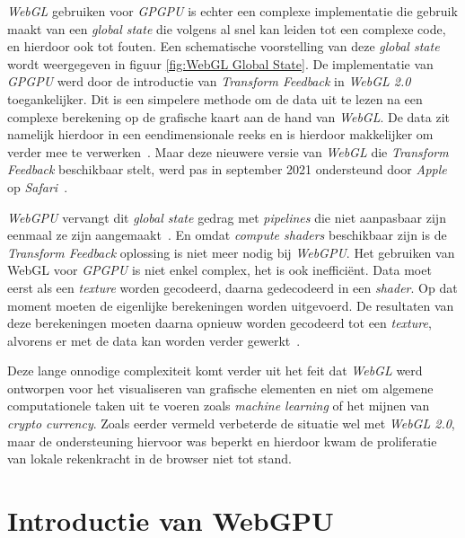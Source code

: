 \textit{WebGL} gebruiken voor \textit{GPGPU} is echter een complexe implementatie die gebruik maakt van een \textit{global state} die volgens \textcite{Surma2022} al snel kan leiden tot een complexe code, en hierdoor ook tot fouten. Een schematische voorstelling van deze \textit{global state} wordt weergegeven in figuur \ref{fig:WebGL Global State}. De implementatie van \textit{GPGPU} werd door de introductie van \textit{Transform Feedback} in \textit{WebGL 2.0} toegankelijker. Dit is een simpelere methode om de data uit te lezen na een complexe berekening op de grafische kaart aan de hand van \textit{WebGL}. De data zit namelijk hierdoor in een eendimensionale reeks en is hierdoor makkelijker om verder mee te verwerken~\autocite{Tavares2021}. Maar deze nieuwere versie van \textit{WebGL} die \textit{Transform Feedback} beschikbaar stelt, werd pas in september 2021 ondersteund door \textit{Apple} op \textit{Safari}~\autocite{Surma2022}.

\bigbreak{}

\textit{WebGPU} vervangt dit \textit{global state} gedrag met \textit{pipelines} die niet aanpasbaar zijn eenmaal ze zijn aangemaakt~\autocite{Beaufort2023}. En omdat \textit{compute shaders} beschikbaar zijn is de \textit{Transform Feedback} oplossing is niet meer nodig bij \textit{WebGPU}. Het gebruiken van WebGL voor \textit{GPGPU} is niet enkel complex, het is ook inefficiënt. Data moet eerst als een \textit{texture} worden gecodeerd, daarna gedecodeerd in een \textit{shader}. Op dat moment moeten de eigenlijke berekeningen worden uitgevoerd. De resultaten van deze berekeningen moeten daarna opnieuw worden gecodeerd tot een \textit{texture}, alvorens er met de data kan worden verder gewerkt~\autocite{Surma2022}.

\bigbreak{}

Deze lange onnodige complexiteit komt verder uit het feit dat \textit{WebGL} werd ontworpen voor het visualiseren van grafische elementen en niet om algemene computationele taken uit te voeren zoals \textit{machine learning} of het mijnen van \textit{crypto currency}. Zoals eerder vermeld verbeterde de situatie wel met \textit{WebGL 2.0}, maar de ondersteuning hiervoor was beperkt en hierdoor kwam de proliferatie van lokale rekenkracht in de browser niet tot stand.

\break{}

\section{Introductie van WebGPU}
\label{sec:IntroWebGPU}

